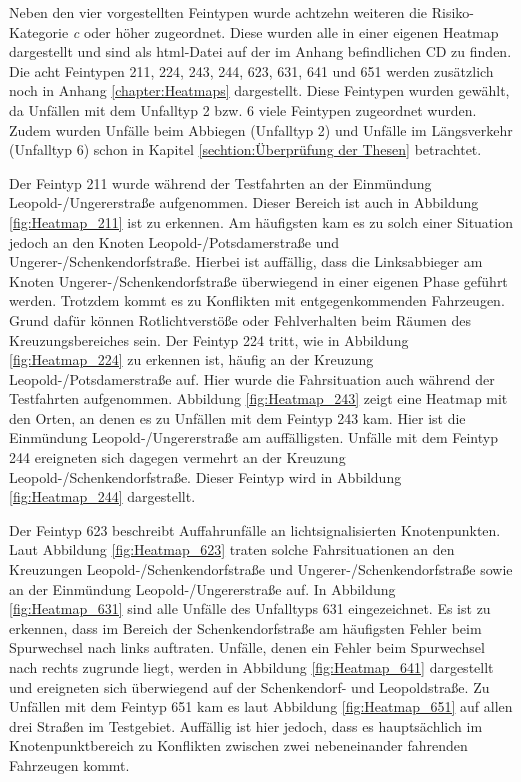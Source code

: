 Neben den vier vorgestellten Feintypen wurde achtzehn weiteren die Risiko-Kategorie \textit{c} oder höher zugeordnet. Diese wurden alle in einer eigenen Heatmap dargestellt und sind als html-Datei auf der im Anhang befindlichen CD zu finden. Die acht Feintypen 211, 224, 243, 244, 623, 631, 641 und 651 werden zusätzlich noch in Anhang \ref{chapter:Heatmaps} dargestellt. Diese Feintypen wurden gewählt, da Unfällen mit dem Unfalltyp 2 bzw. 6 viele Feintypen zugeordnet wurden. Zudem wurden Unfälle beim Abbiegen (Unfalltyp 2) und Unfälle im Längsverkehr (Unfalltyp 6) schon in Kapitel \ref{sechtion:Überprüfung der Thesen} betrachtet.

Der Feintyp 211 wurde während der Testfahrten an der Einmündung Leopold-/Ungererstraße aufgenommen. Dieser Bereich ist auch in Abbildung \ref{fig:Heatmap_211} ist zu erkennen. Am häufigsten kam es zu solch einer Situation jedoch an den Knoten Leopold-/Potsdamerstraße und Ungerer-/Schenkendorfstraße. Hierbei ist auffällig, dass die Linksabbieger am Knoten Ungerer-/Schenkendorfstraße überwiegend in einer eigenen Phase geführt werden. Trotzdem kommt es zu Konflikten mit entgegenkommenden Fahrzeugen. Grund dafür können Rotlichtverstöße oder Fehlverhalten beim Räumen des Kreuzungsbereiches sein. Der Feintyp 224 tritt, wie in Abbildung \ref{fig:Heatmap_224} zu erkennen ist, häufig an der Kreuzung Leopold-/Potsdamerstraße auf. Hier wurde die Fahrsituation auch während der Testfahrten aufgenommen. Abbildung \ref{fig:Heatmap_243} zeigt eine Heatmap mit den Orten, an denen es zu Unfällen mit dem Feintyp 243 kam. Hier ist die Einmündung Leopold-/Ungererstraße am auffälligsten. Unfälle mit dem Feintyp 244 ereigneten sich dagegen vermehrt an der Kreuzung Leopold-/Schenkendorfstraße. Dieser Feintyp wird in Abbildung \ref{fig:Heatmap_244} dargestellt.

Der Feintyp 623 beschreibt Auffahrunfälle an lichtsignalisierten Knotenpunkten. Laut Abbildung \ref{fig:Heatmap_623} traten solche Fahrsituationen an den Kreuzungen Leopold-/Schenkendorfstraße und Ungerer-/Schenkendorfstraße sowie an der Einmündung Leopold-/Ungererstraße auf. In Abbildung \ref{fig:Heatmap_631} sind alle Unfälle des Unfalltyps 631 eingezeichnet. Es ist zu erkennen, dass im Bereich der Schenkendorfstraße am häufigsten Fehler beim Spurwechsel nach links auftraten. Unfälle, denen ein Fehler beim Spurwechsel nach rechts zugrunde liegt, werden in Abbildung \ref{fig:Heatmap_641} dargestellt und ereigneten sich überwiegend auf der Schenkendorf- und Leopoldstraße. Zu Unfällen mit dem Feintyp 651 kam es laut Abbildung \ref{fig:Heatmap_651} auf allen drei Straßen im Testgebiet. Auffällig ist hier jedoch, dass es hauptsächlich im Knotenpunktbereich zu Konflikten zwischen zwei nebeneinander fahrenden Fahrzeugen kommt.

